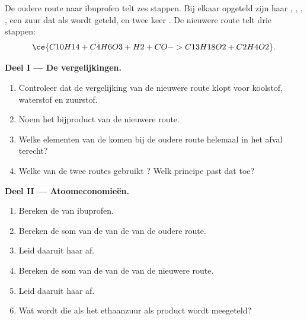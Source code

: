 \begin{problem}
\label{pb:g12:synthesis-strategy:1}
De oudere route naar ibuprofen  telt zes stappen. Bij elkaar
opgeteld zijn haar  , ,
, , een zuur dat als  wordt geteld,
 en twee keer . De nieuwere route telt drie stappen:
\[
  \ce{C10H14 + C4H6O3 + H2 + CO -> C13H18O2 + C2H4O2} .
\]

\medskip
\noindent\textbf{Deel I --- De vergelijkingen.}
\begin{enumerate}
  \item Controleer dat de vergelijking van de nieuwere route klopt voor
        koolstof, waterstof en zuurstof.
  \item Noem het bijproduct van de nieuwere route.
  \item Welke elementen van de  komen bij de oudere route
        helemaal in het afval terecht?
  \item Welke van de twee routes gebruikt ? Welk principe
        past dat toe?
\end{enumerate}

\medskip
\noindent\textbf{Deel II --- Atoomeconomieën.}
\begin{enumerate}[resume]
  \item Bereken de  van ibuprofen.
  \item Bereken de som van de  van de  van de
        oudere route.
  \item Leid daaruit haar  af.
  \item Bereken de som van de  van de  van de
        nieuwere route.
  \item Leid daaruit haar  af.
  \item Wat wordt die als het ethaanzuur als product wordt meegeteld?
\end{enumerate}


\end{problem}
